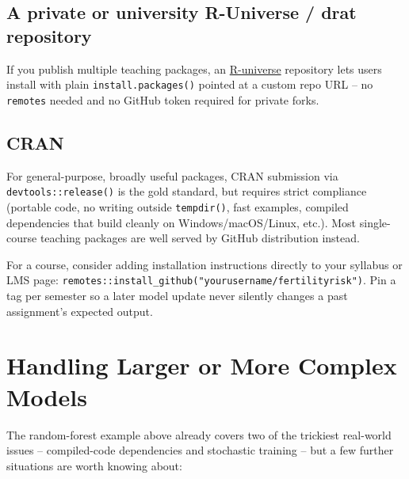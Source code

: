 \documentclass[11pt]{article}
\begin{document}
\subsection{A private or university R-Universe / drat repository}
If you publish multiple teaching packages, an \href{https://r-universe.dev}{R-universe} repository lets users install with plain \texttt{install.packages()} pointed at a custom repo URL -- no \texttt{remotes} needed and no GitHub token required for private forks.

\subsection{CRAN}
For general-purpose, broadly useful packages, CRAN submission via \texttt{devtools::release()} is the gold standard, but requires strict compliance (portable code, no writing outside \texttt{tempdir()}, fast examples, compiled dependencies that build cleanly on Windows/macOS/Linux, etc.). Most single-course teaching packages are well served by GitHub distribution instead.

\begin{tipbox}
For a course, consider adding installation instructions directly to your syllabus or LMS page:
\texttt{remotes::install\_github("yourusername/fertilityrisk")}. Pin a tag per semester so a later model update never silently changes a past assignment's expected output.
\end{tipbox}

\section{Handling Larger or More Complex Models}

The random-forest example above already covers two of the trickiest real-world issues -- compiled-code dependencies and stochastic training -- but a few further situations are worth knowing about:
\end{document}
